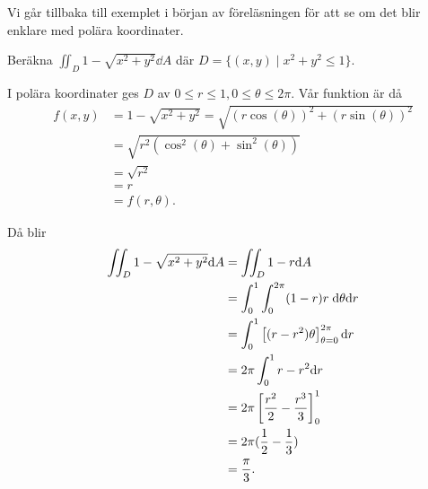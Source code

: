 \documentclass[a4paper]{article}
\begin{document}
\begin{ex}
    Vi går tillbaka till exemplet i början av föreläsningen för att se 
    om det blir enklare med polära koordinater.

    Beräkna \(
        \iint_D 1-\sqrt{x^2+y^2} \dd A
    \) där \(
        D = \{ (x,y)\;|\; x^2+y^2\leq 1 \}
    \).

    I polära koordinater ges \(
        D
    \) av \(
        0 \leq r \leq 1, 0 \leq \theta \leq 2 \pi
    \). Vår funktion är då
    \begin{align*}
        f(x,y) &= 1 - \sqrt{x^2+y^2} = \sqrt{(r \cos(\theta))^2 + (r \sin(\theta))^2}\\
            &= \sqrt{r^2 (\cos^2(\theta) + \sin^2(\theta))} \\
            &= \sqrt{r^2}\\
            &= r\\
            &= f(r, \theta).
    \end{align*} 
    
    Då blir 
    \begin{align*}
        \iint_D 1-\sqrt{x^2+y^2} \dd A &= \iint_D 1-r \dd A \\
            &= \int_0^1 \int_0^{2\pi} (1-r)r\; \dd \theta \dd r\\
            &= \int_0^1 \left[ (r-r^2) \theta \right]_{\theta=0}^{2\pi} \dd r\\
            &= 2 \pi \int_0^1 r-r^2 \dd r\\
            &= 2 \pi \left[ \frac{r^2}{2} - \frac{r^3}{3} \right]_0^1 \\
            &= 2\pi(\frac{1}{2} - \frac{1}{3}) \\
            &= \frac{\pi}{3}.
    \end{align*}
\end{ex}
\end{document}
